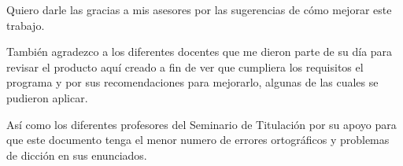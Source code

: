 \begin{thanks}



Quiero darle las gracias a mis asesores por las sugerencias de cómo mejorar este trabajo. 

También agradezco a los diferentes docentes que me dieron parte de su día para revisar el producto aquí creado a fin de ver que cumpliera los requisitos el programa y por sus recomendaciones para mejorarlo, algunas de las cuales se pudieron aplicar. 

Así como los diferentes profesores del Seminario de Titulación por su apoyo para que este documento tenga el menor numero de errores ortográficos y problemas de dicción en sus enunciados.

\end{thanks}
